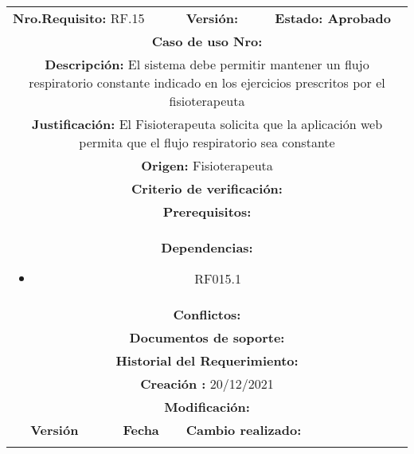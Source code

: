 \begin{center}
\begin{tabular}{|c|c|p{4cm}|p{4cm}|}
            \hline
            \rowcolor{yellow} \multicolumn{4}{|c|}{\textbf{Prioridad:} Baja}  \\
            \hline
            \multicolumn{2}{|l}{\textbf{Nro.Requisito: }RF.15} & \multicolumn{1}{l|}{\textbf{Versión: }} & \multicolumn{1}{|l|}{\textbf{Estado: Aprobado}}  \\
            \multicolumn{4}{|p{12cm}|}{\textbf{Caso de uso Nro: }}  \\
            \hline
            \multicolumn{4}{|p{13cm}|}{\textbf{Descripción: }El sistema debe permitir mantener un flujo respiratorio constante indicado en los ejercicios prescritos por el fisioterapeuta}  \\
            \multicolumn{4}{|p{13cm}|}{\textbf{Justificación: }El Fisioterapeuta solicita que la aplicación web permita que el flujo respiratorio sea constante}  \\
            \multicolumn{4}{|p{12cm}|}{\textbf{Origen: }Fisioterapeuta}  \\
            \multicolumn{4}{|p{13cm}|}{\textbf{Criterio de verificación: }}  \\
            \hline
            \multicolumn{4}{|p{13cm}|}{\textbf{Prerequisitos: }}  \\
            \hline \multicolumn{4}{|p{12cm}|}{\textbf{Dependencias: }
               \begin{itemize}
                   \item RF015.1
               \end{itemize}
               }  \\
            \multicolumn{4}{|p{12cm}|}{\textbf{Conflictos: }}  \\
            \hline
            \multicolumn{4}{|p{12cm}|}{\textbf{Documentos de soporte: }}  \\
            \hline
            \multicolumn{4}{|p{12cm}|}{\textbf{Historial del Requerimiento: }}  \\
            \multicolumn{4}{|p{12cm}|}{\textbf{Creación : }20/12/2021}  \\
            \multicolumn{4}{|p{12cm}|}{\textbf{Modificación: }}  \\
             \textbf{Versión} & \textbf{Fecha} & \multicolumn{2}{p{8cm}|}{\textbf{Cambio realizado:}} \\
            \hline
                    & &   \multicolumn{2}{p{8cm}|}{}
              \\
            \hline
        \end{tabular}











        
        

        
        
        
\end{center}